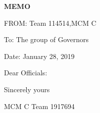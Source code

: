 \documentclass[13pt]{ctexart}
\begin{document}
{\centering\fontsize{18pt}{14pt}\selectfont \textbf{MEMO}\par}

\vspace{8pt}

\noindent FROM: Team {} 114514,MCM C

\noindent To: The group of Governors

\noindent Date: January 28, 2019%
\vspace{15pt}

Dear Officials:

\lipsum[40]

\vspace{15pt}

{\raggedleft
Sincerely yours

MCM C Team 1917694\par
}
\end{document}
